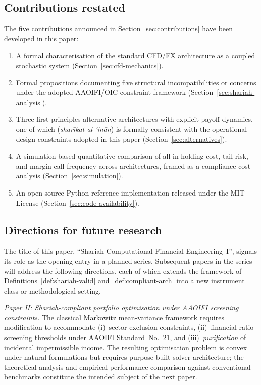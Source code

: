 \documentclass[preprint,12pt,authoryear]{elsarticle}
\theoremstyle{definition}
\begin{document}
\subsection{Contributions restated}
\label{sec:concl-contributions}

The five contributions announced in
Section~\ref{sec:contributions} have been developed in this
paper:
\begin{enumerate}
    \item A formal characterisation of the standard CFD/FX
    architecture as a coupled stochastic system
    (Section~\ref{sec:cfd-mechanics}).
    \item Formal propositions documenting five structural
    incompatibilities or concerns under the adopted AAOIFI/OIC
    constraint framework (Section~\ref{sec:shariah-analysis}).
    \item Three first-principles alternative architectures with
    explicit payoff dynamics, one of which
    (\emph{shar\={\i}kat al-'in\={a}n}) is formally consistent
    with the operational design constraints adopted in this
    paper (Section~\ref{sec:alternatives}).
    \item A simulation-based quantitative comparison of all-in
    holding cost, tail risk, and margin-call frequency across
    architectures, framed as a compliance-cost analysis
    (Section~\ref{sec:simulation}).
    \item An open-source Python reference implementation
    released under the MIT License
    (Section~\ref{sec:code-availability}).
\end{enumerate}

\subsection{Directions for future research}
\label{sec:concl-future}

The title of this paper, ``Shariah Computational Financial
Engineering~I'', signals its role as the opening entry in a
planned series. Subsequent papers in the series will address the
following directions, each of which extends the framework of
Definitions~\ref{def:shariah-valid}
and~\ref{def:compliant-arch} into a new instrument class or
methodological setting.

\emph{Paper II: Shariah-compliant portfolio optimisation under
AAOIFI screening constraints.} The classical Markowitz
mean-variance framework requires modification to accommodate
(i)~sector exclusion constraints, (ii)~financial-ratio screening
thresholds under AAOIFI Standard~No.~21, and
(iii)~\emph{purification} of incidental impermissible income.
The resulting optimisation problem is convex under natural
formulations but requires purpose-built solver architecture; the
theoretical analysis and empirical performance comparison
against conventional benchmarks constitute the intended subject
of the next paper.
\end{document}
